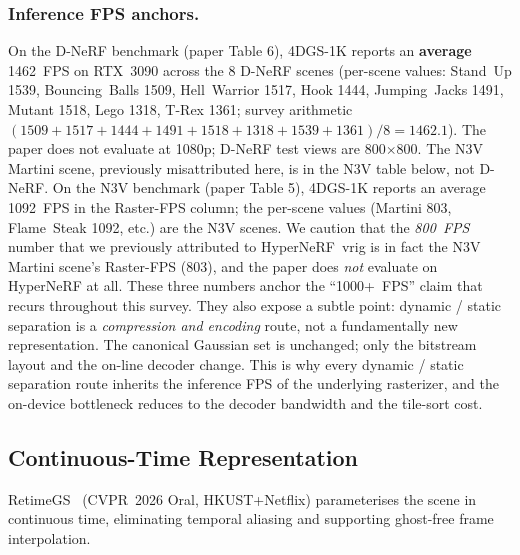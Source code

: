 \subsubsection{Inference FPS anchors.}
On the D-NeRF benchmark (paper Table 6), 4DGS-1K reports an
\textbf{average} 1462~FPS on RTX~3090 across the 8 D-NeRF
scenes (per-scene values: Stand~Up 1539, Bouncing~Balls 1509,
Hell~Warrior 1517, Hook 1444, Jumping~Jacks 1491, Mutant 1518,
Lego 1318, T-Rex 1361; survey arithmetic
$(1509+1517+1444+1491+1518+1318+1539+1361)/8 = 1462.1$).
The paper does not evaluate
at 1080p; D-NeRF test views are 800$\times$800. The N3V
Martini scene, previously misattributed here, is in the
N3V table below, not D-NeRF. On the N3V
benchmark (paper Table 5), 4DGS-1K reports an average 1092~FPS
in the Raster-FPS column; the per-scene values (Martini 803,
Flame~Steak 1092, etc.) are the N3V scenes. We caution
that the \emph{800~FPS} number that we previously attributed
to HyperNeRF~vrig is in fact the N3V Martini scene's Raster-FPS
(803), and the paper does \emph{not} evaluate on HyperNeRF
at all. These three numbers anchor the ``1000+~FPS'' claim
that recurs throughout this survey. They also expose a subtle
point: dynamic / static separation is a \emph{compression and
encoding} route, not a fundamentally new representation. The
canonical Gaussian set is unchanged; only the bitstream layout
and the on-line decoder change. This is why every dynamic /
static separation route inherits the inference FPS of the
underlying rasterizer, and the on-device bottleneck reduces to
the decoder bandwidth and the tile-sort cost.



\subsection{Continuous-Time Representation}
RetimeGS~\cite{wang2026retimegs} (CVPR~2026 Oral, HKUST+Netflix)
parameterises the scene in continuous time, eliminating temporal
aliasing and supporting ghost-free frame interpolation.

